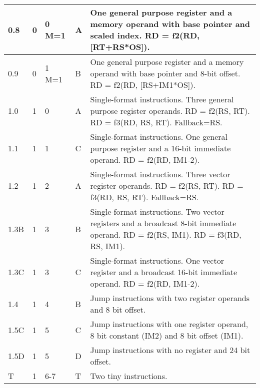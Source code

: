 \documentclass[forwardcom.tex]{subfiles}
\begin{document}
\begin{longtable} {|p{10mm}|p{6mm}|p{9mm}|p{7mm}|p{80mm}|}
\hline
0.8 & 0 & 0 M=1 & A & One general purpose register and a memory operand with base pointer and scaled index. \newline
RD = f2(RD, [RT+RS*OS]).\\

\hline
0.9 & 0 & 1 M=1 & B & One general purpose register and a memory operand with base pointer and 8-bit offset. \newline
RD = f2(RD, [RS+IM1*OS]).\\

\hline
1.0 & 1 & 0 & A & Single-format instructions. Three general purpose register operands. \newline 
RD = f2(RS, RT). RD = f3(RD, RS, RT).\newline 
Fallback=RS.\\

\hline
1.1 & 1 & 1 & C & Single-format instructions. One general purpose register and a 16-bit immediate operand. \newline 
RD = f2(RD, IM1-2).\\

\hline
1.2 & 1 & 2 & A & Single-format instructions. Three vector register operands. \newline 
RD = f2(RS, RT). RD = f3(RD, RS, RT).\newline 
Fallback=RS.\\

\hline
1.3B & 1 & 3 & B & Single-format instructions. Two vector registers and a broadcast 8-bit immediate operand. \newline 
RD = f2(RS, IM1). RD = f3(RD, RS, IM1). \\

\hline
1.3C & 1 & 3 & C & Single-format instructions. One vector register and a broadcast 16-bit immediate operand. \newline 
RD = f2(RD, IM1-2). \\

\hline
1.4 & 1 & 4 & B & Jump instructions with two register operands and 8 bit offset.\\

\hline
1.5C & 1 & 5 & C & Jump instructions with one register operand, 8 bit constant (IM2) and 8 bit offset (IM1).\\

\hline
1.5D & 1 & 5 & D & Jump instructions with no register and 24 bit offset.  \\

\hline
T & 1 & 6-7 & T & Two tiny instructions.\\


\end{longtable}
\end{document}
